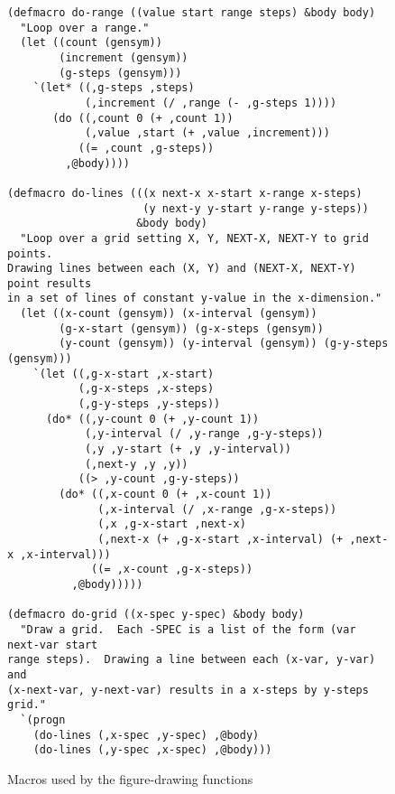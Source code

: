 \documentclass{article}
\begin{document}
\begin{figure}
  \centering
\begin{verbatim}
(defmacro do-range ((value start range steps) &body body)
  "Loop over a range."
  (let ((count (gensym))
        (increment (gensym))
        (g-steps (gensym)))
    `(let* ((,g-steps ,steps)
            (,increment (/ ,range (- ,g-steps 1))))
       (do ((,count 0 (+ ,count 1))
            (,value ,start (+ ,value ,increment)))
           ((= ,count ,g-steps))
         ,@body))))

(defmacro do-lines (((x next-x x-start x-range x-steps)
                     (y next-y y-start y-range y-steps))
                    &body body)
  "Loop over a grid setting X, Y, NEXT-X, NEXT-Y to grid points.
Drawing lines between each (X, Y) and (NEXT-X, NEXT-Y) point results
in a set of lines of constant y-value in the x-dimension."
  (let ((x-count (gensym)) (x-interval (gensym)) 
        (g-x-start (gensym)) (g-x-steps (gensym))
        (y-count (gensym)) (y-interval (gensym)) (g-y-steps (gensym)))
    `(let ((,g-x-start ,x-start)
           (,g-x-steps ,x-steps)
           (,g-y-steps ,y-steps))
      (do* ((,y-count 0 (+ ,y-count 1))
            (,y-interval (/ ,y-range ,g-y-steps))
            (,y ,y-start (+ ,y ,y-interval))
            (,next-y ,y ,y))
           ((> ,y-count ,g-y-steps))
        (do* ((,x-count 0 (+ ,x-count 1))
              (,x-interval (/ ,x-range ,g-x-steps))
              (,x ,g-x-start ,next-x)
              (,next-x (+ ,g-x-start ,x-interval) (+ ,next-x ,x-interval)))
             ((= ,x-count ,g-x-steps))
          ,@body)))))

(defmacro do-grid ((x-spec y-spec) &body body)
  "Draw a grid.  Each -SPEC is a list of the form (var next-var start
range steps).  Drawing a line between each (x-var, y-var) and
(x-next-var, y-next-var) results in a x-steps by y-steps grid."
  `(progn 
    (do-lines (,x-spec ,y-spec) ,@body)
    (do-lines (,y-spec ,x-spec) ,@body)))
\end{verbatim}
  \caption{Macros used by the figure-drawing functions}
\end{figure}
\end{document}
